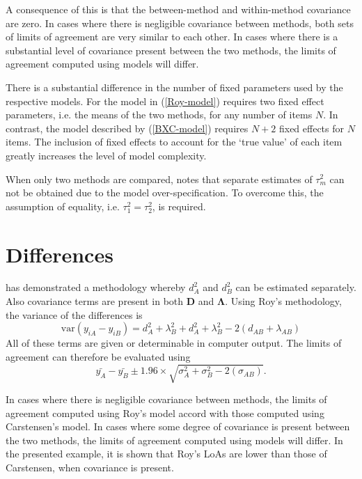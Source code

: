 \documentclass[12pt, a4paper]{report}
\theoremstyle{plain}
\theoremstyle{definition}
\theoremstyle{remark}
\begin{document}
A consequence of this is that the between-method and within-method covariance are zero. In cases where there is negligible covariance between methods, both sets of limits of agreement are very similar to each other. In cases where there is a substantial level of covariance present between the two methods, the limits of agreement computed using models will differ.

There is a substantial difference in the number of fixed parameters used by the respective models. For the model in (\ref{Roy-model}) requires two fixed effect parameters, i.e. the means of the two methods, for any number of items $N$. In contrast, the model described by (\ref{BXC-model}) requires $N+2$ fixed effects for $N$ items. The inclusion of fixed effects to account for the `true value' of each item greatly increases the level of model complexity.

When only two methods are compared, \citet{BXC2008} notes that separate estimates of $\tau^2_m$ can not be obtained due to the model over-specification. To overcome this, the assumption of equality, i.e. $\tau^2_1 = \tau^2_2$, is required.

\section{Differences}
\citet{ARoy2009} has demonstrated a methodology whereby $d^2_{A}$ and $d^2_{B}$ can be estimated separately. Also covariance terms are present in both $\boldsymbol{D}$ and $\boldsymbol{\Lambda}$. Using Roy's methodology, the variance of the differences is
\begin{equation}
\mbox{var} (y_{iA}-y_{iB})= d^2_{A} + \lambda^2_{B} + d^2_{A} + \lambda^2_{B} - 2(d_{AB} + \lambda_{AB})
\end{equation}
All of these terms are given or determinable in computer output.
The limits of agreement can therefore be evaluated using
\begin{equation}
\bar{y_{A}}-\bar{y_{B}} \pm 1.96 \times \sqrt{ \sigma^2_{A} + \sigma^2_{B}  - 2(\sigma_{AB})}.
\end{equation}




In cases where there is negligible covariance between methods, the limits of agreement computed using Roy's model accord with those computed using Carstensen's model. In cases where some degree of
covariance is present between the two methods, the limits of agreement computed using models will differ. In the presented
example, it is shown that Roy's LoAs are lower than those of Carstensen, when covariance is present.
\end{document}
